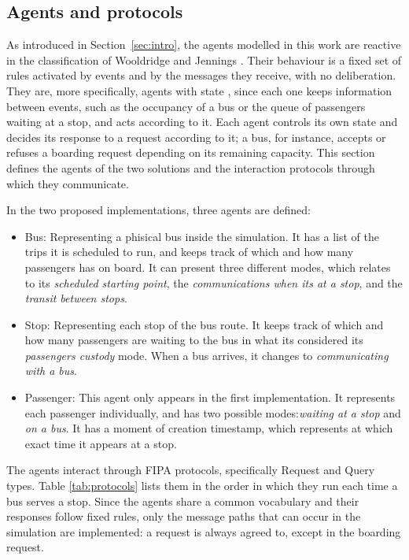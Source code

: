 \documentclass[a4paper,fleqn]{cas-sc}
\begin{document}
\subsection{Agents and protocols}

As introduced in Section~\ref{sec:intro}, the agents modelled in this work are
reactive in the classification of Wooldridge and Jennings
\cite{wooldridge1995intelligent}. Their behaviour is a fixed set of rules
activated by events and by the messages they receive, with no deliberation.
They are, more specifically, agents with state \cite{wooldridge1999intelligent},
since each one keeps information between events, such as the occupancy of a
bus or the queue of passengers waiting at a stop, and acts according to it.
Each agent controls its own state and decides its response to a request
according to it; a bus, for instance, accepts or refuses a boarding request
depending on its remaining capacity.
This section defines the agents of the two solutions and the interaction
protocols through which they communicate.

In the two proposed implementations, three agents are defined:

\begin{itemize}
  \item Bus: Representing a phisical bus inside the simulation. It has a list of the trips it is
  scheduled to run, and keeps track of which and how many passengers has on board.
  It can present three different modes, which relates to its
  \textit{scheduled starting point}, the \textit{communications when its at a stop}, and
  the \textit{transit between stops}.
  \item Stop: Representing each stop of the bus route. It keeps track of which and how many passengers
  are waiting to the bus in what its considered its \textit{passengers custody} mode.
  When a bus arrives, it changes to \textit{communicating with a bus}.
  \item Passenger: This agent only appears in the first implementation. It represents each passenger
  individually, and has two possible modes:\textit{waiting at a stop} and \textit{on a bus}. 
  It has a moment of creation timestamp, which represents at which exact time it appears at a stop.
\end{itemize}

The agents interact through FIPA protocols, specifically Request \cite{fipa2002request} and Query
\cite{fipa2002query} types. Table \ref{tab:protocols} lists them in the order
in which they run each time a bus serves a stop. Since the agents share a
common vocabulary and their responses follow fixed rules, only the message
paths that can occur in the simulation are implemented: a request is always
agreed to, except in the boarding request.
\end{document}
